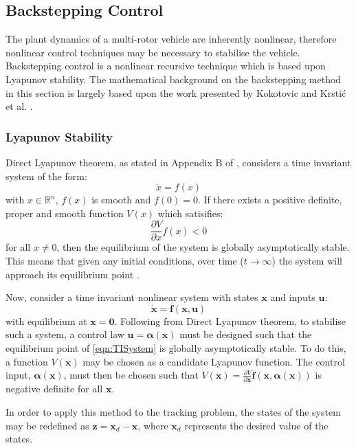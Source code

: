 \subsection{Backstepping Control}\label{section:BacksteppingBackground}
The plant dynamics of a multi-rotor vehicle are inherently nonlinear, therefore nonlinear control techniques may be necessary to stabilise the vehicle. Backstepping control is a nonlinear recursive technique which is based upon Lyapunov stability. The mathematical background on the backstepping method in this section is largely based upon the work presented by Kokotovic \cite{1992a} and Krsti\'c et al. \cite{Krstic1995}.

\subsubsection{Lyapunov Stability}
Direct Lyapunov theorem, as stated in Appendix B of \cite{Isidori1995}, considers a time invariant system of the form:
\[\dot{x}=f(x)\]
with $x\in\mathbb{R}^{n}$, $f(x)$ is smooth and $f(0)=0$. If there exists a positive definite, proper and smooth function $V(x)$ which satisifies:
\[\frac{\partial V}{\partial x}f(x)<0\]
for all $x\neq0$, then the equilibrium of the system is globally asymptotically stable. This means that given any initial conditions, over time ($t\rightarrow\infty$) the system will approach its equilibrium point \cite{Chen1999}. 

Now, consider a time invariant nonlinear system with states $\mathbf{x}$ and inputs $\mathbf{u}$:
\begin{equation}\label{eqn:TISystem}
\mathbf{\dot{x}}=\mathbf{f}(\mathbf{x},\mathbf{u})
\end{equation}
with equilibrium at $\mathbf{x}=\mathbf{0}$. Following from Direct Lyapunov theorem, to stabilise such a system, a control law $\mathbf{u}=\mathbf{\alpha}(\mathbf{x})$ must be designed such that the equilibrium point of \eqref{eqn:TISystem} is globally asymptotically stable. To do this, a function $V(\mathbf{x})$ may be chosen as a candidate Lyapunov function. The control input, $\mathbf{\alpha}(\mathbf{x})$, must then be chosen such that $\dot{V}(\mathbf{x})=\frac{\partial V}{\partial \mathbf{x}}\mathbf{f}(\mathbf{x},\mathbf{\alpha}(\mathbf{x}))$ is negative definite for all $\mathbf{x}$. 

In order to apply this method to the tracking problem, the states of the system may be redefined as $\mathbf{z}=\mathbf{x}_{d}-\mathbf{x}$, where $\mathbf{x}_{d}$ represents the desired value of the states.

